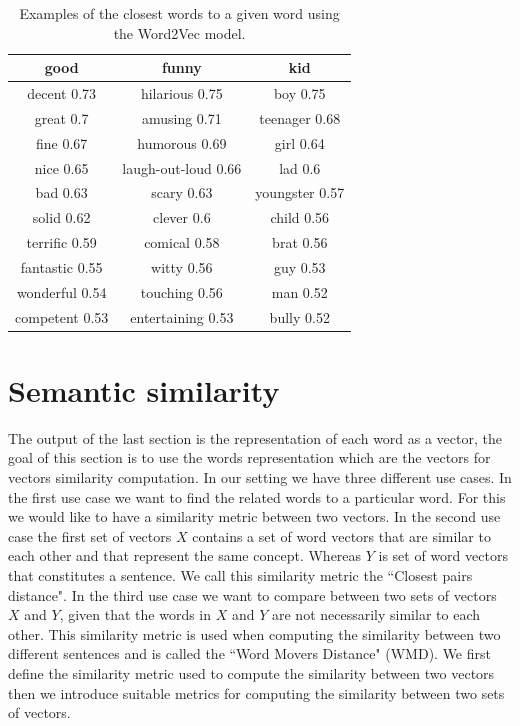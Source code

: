 \documentclass{article}
\begin{document}
\begin{table}[]
\centering
\caption{Examples of the closest words to a given word using the Word2Vec model.}
\label{wordvec}
\begin{tabular}{|c|c|c|}
\hline
good&funny&kid\\
\hline
decent  0.73&hilarious  0.75&boy  0.75\\
great  0.7&amusing  0.71&teenager  0.68\\
fine  0.67&humorous  0.69&girl  0.64\\
nice  0.65&laugh-out-loud  0.66&lad  0.6\\
bad  0.63&scary  0.63&youngster  0.57\\
solid  0.62&clever  0.6&child  0.56\\
terrific  0.59&comical  0.58&brat  0.56\\
fantastic  0.55&witty  0.56&guy  0.53\\
wonderful  0.54&touching  0.56&man  0.52\\
competent  0.53&entertaining  0.53&bully  0.52\\
\hline
\end{tabular}
\end{table}



\section{Semantic similarity}
The output of the last section is the representation of each word as a vector, the goal of this section is to use the words representation which are the vectors for vectors similarity computation. 
In our setting we have three different use cases. In the first use case we want to find the related words to a particular word. For this we would like to have a similarity metric between two vectors.
In the second use case the first set of vectors $X$  contains a set of word vectors that are similar to each other and that represent the same concept. Whereas $Y$ is set of word vectors that constitutes a sentence. We call this similarity metric the ``Closest pairs distance". 
In the third use case we want to compare between two sets of vectors $X$ and $Y$, given that the words in  $X$ and $Y$ are not necessarily similar to each other. This similarity metric is used when computing the similarity between two different sentences and is called the ``Word Movers Distance" (WMD).
We first define the similarity metric used to compute the similarity between two vectors then we introduce suitable metrics for computing the similarity between two sets of vectors.
\end{document}
